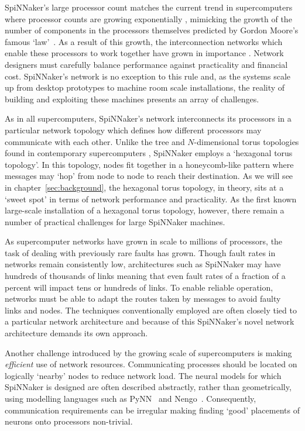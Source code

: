 SpiNNaker's large processor count matches the current trend in supercomputers
where processor counts are growing exponentially \cite{meuer16j}, mimicking the
growth of the number of components in the processors themselves predicted by
Gordon Moore's famous `law'~\cite{moore75}. As a result of this growth, the
interconnection networks which enable these processors to work together have
grown in importance \cite{dally01}. Network designers must carefully balance
performance against practicality and financial cost.  SpiNNaker's network is no
exception to this rule and, as the systems scale up from desktop prototypes to
machine room scale installations, the reality of building and exploiting these
machines presents an array of challenges.

As in all supercomputers, SpiNNaker's network interconnects its processors in
a particular network topology which defines how different processors may
communicate with each other. Unlike the tree and $N$-dimensional torus
topologies found in contemporary supercomputers \cite[chapter~3]{dally04},
SpiNNaker employs a `hexagonal torus topology'. In this topology, nodes fit
together in a honeycomb-like pattern where messages may `hop' from node to node
to reach their destination. As we will see in chapter~\ref{sec:background}, the
hexagonal torus topology, in theory, sits at a `sweet spot' in terms of network
performance and practicality. As the first known large-scale installation of a
hexagonal torus topology, however, there remain a number of practical
challenges for large SpiNNaker machines.

As supercomputer networks have grown in scale to millions of processors, the
task of dealing with previously rare faults has grown.  Though fault rates in
networks remain consistently low, architectures such as SpiNNaker may have
hundreds of thousands of links meaning that even fault rates of a fraction of a
percent will impact tens or hundreds of links. To enable reliable operation,
networks must be able to adapt the routes taken by messages to avoid faulty
links and nodes. The techniques conventionally employed are often closely tied
to a particular network architecture and because of this SpiNNaker's novel
network architecture demands its own approach.

Another challenge introduced by the growing scale of supercomputers is making
\emph{efficient} use of network resources. Communicating processes should be
located on logically `nearby' nodes to reduce network load. The neural models
for which SpiNNaker is designed are often described abstractly, rather than
geometrically, using modelling languages such as PyNN~\cite{davison08} and
Nengo~\cite{eliasmith04}.  Consequently, communication requirements can be
irregular making finding `good' placements of neurons onto processors
non-trivial.

